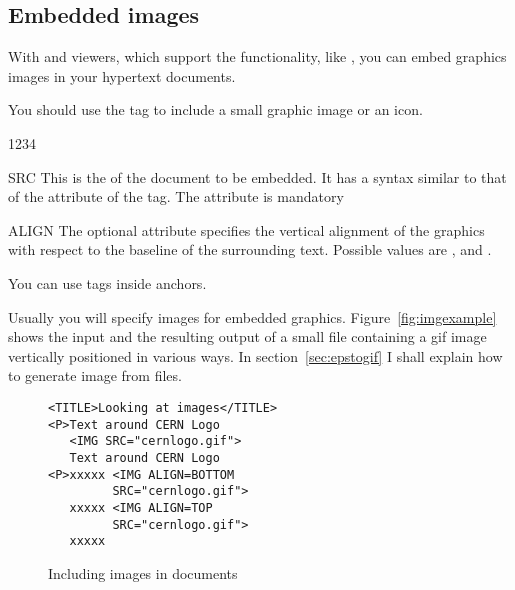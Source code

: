 \subsection*{Embedded images}

With \Html{} and viewers, which support the functionality, like
\Xmosaic{}, you can embed graphics images in your hypertext
documents.

You should use the  tag to include a small graphic image or an icon.
   
\begin{XMP}
\end{XMP}
   
\begin{DLtt}{1234}
\item[SRC]   This is the \URL{} of the document to be embedded. 
             It has a syntax similar to that of the  attribute of
             the  tag. 
             The attribute is mandatory
\item[ALIGN] The optional attribute specifies the vertical alignment
             of the graphics with respect to the baseline of the 
             surrounding text.
             Possible values are ,  and .
\end{DLtt}
                         
You can use  tags inside anchors.
   
Usually you will specify \gif{} images for embedded graphics.
Figure~\vref{fig:imgexample} shows the input and the resulting
output of a small \Html{} file containing a gif image vertically 
positioned in various ways.
In section~\ref{sec:epstogif} I shall explain how to generate
\gif{} image from \PS{} files.

\begin{figure}[p]
  \begin{sideways}
    \begin{minipage}[b]{0.999\textheight}%
\begin{minipage}[b]{.35\textwidth}
\small
\begin{verbatim}
<TITLE>Looking at images</TITLE>
<P>Text around CERN Logo 
   <IMG SRC="cernlogo.gif">
   Text around CERN Logo 
<P>xxxxx <IMG ALIGN=BOTTOM 
         SRC="cernlogo.gif">
   xxxxx <IMG ALIGN=TOP    
         SRC="cernlogo.gif">
   xxxxx
\end{verbatim}
\end{minipage} \hfill
\begin{minipage}[b]{.64\textwidth}
\end{minipage}
  \caption{Including \protect\gif{} images in \protect\Html{} documents}
  \label{fig:imgexample}
\end{minipage}
\end{sideways}
\end{figure}

